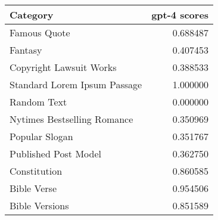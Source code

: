 \begin{tabular}{lr}
\toprule
Category & gpt-4 scores \\
\midrule
Famous Quote & 0.688487 \\
Fantasy & 0.407453 \\
Copyright Lawsuit Works & 0.388533 \\
Standard Lorem Ipsum Passage & 1.000000 \\
Random Text & 0.000000 \\
Nytimes Bestselling Romance & 0.350969 \\
Popular Slogan & 0.351767 \\
Published Post Model & 0.362750 \\
Constitution & 0.860585 \\
Bible Verse & 0.954506 \\
Bible Versions & 0.851589 \\
\bottomrule
\end{tabular}
